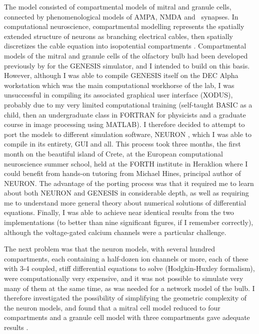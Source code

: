 The model consisted of compartmental models of mitral and granule cells, connected by phenomenological models of AMPA, NMDA and \GABAA\ synapses.
In computational neuroscience, compartmental modelling represents the spatially extended structure of neurons as branching electrical cables,
 then spatially discretizes the cable equation into isopotential compartments \cite{Rall:1967}.
Compartmental models of the mitral and granule cells of the olfactory bulb had been developed previously by \citet{Bhalla:1993} for the GENESIS simulator\citep{GENESIS}, and I intended to build on this basis.
However, although I was able to compile GENESIS itself on the DEC Alpha workstation which was the main computational workhorse of the lab, I was unsuccessful in compiling its associated graphical user interface (XODUS),
probably due to my very limited computational training (self-taught BASIC as a child, then an undergraduate class in FORTRAN for physicists and a graduate course in image processing using MATLAB).
I therefore decided to attempt to port the models to different simulation software, NEURON \cite{Hines:1997},
which I was able to compile in its entirety, GUI and all.
This process took three months, the first month on the beautiful island of Crete, at the European computational neuroscience summer school,
held at the FORTH institute in Heraklion where I could benefit from hands-on tutoring from Michael Hines, principal author of NEURON.
The advantage of the porting process was that it required me to learn about both NEURON and GENESIS in considerable depth,
as well as requiring me to understand more general theory about numerical solutions of differential equations.
Finally, I was able to achieve near identical results from the two implementations
(to better than nine significant figures, if I remember correctly), although the voltage-gated calcium channels were a particular challenge.

The next problem was that the neuron models, with several hundred compartments, each containing a half-dozen ion channels or more,
each of these with 3-4 coupled, stiff differential equations to solve (Hodgkin-Huxley formalism), were computationally
very expensive, and it was not possible to simulate very many of them at the same time, as was needed for a network model of the bulb.
I therefore investigated the possibility of simplifying the geometric complexity of the neuron models, and found that a mitral cell model reduced to four compartments and a granule cell model with three compartments gave adequate results \cite{Davison:2000}.

